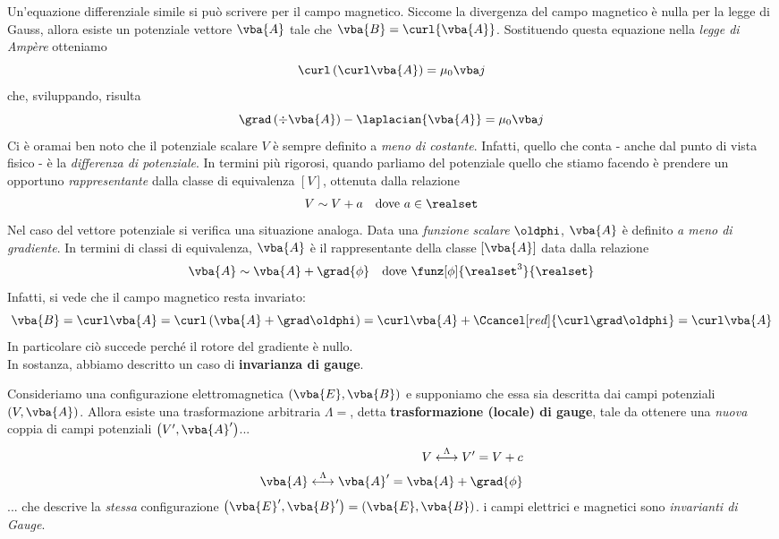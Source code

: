 Un'equazione differenziale simile si può scrivere per il campo magnetico.		Siccome la divergenza del campo magnetico è nulla per la legge di Gauss, allora esiste un potenziale vettore $\vba{A}$ tale che $\vba{B}=\curl{\vba{A}}$. Sostituendo questa equazione nella \textit{legge di Ampère} otteniamo
\begin{equation*}
	\curl\left(\curl\vba{A}\right)=\mu_0\vba j
\end{equation*}
che, sviluppando, risulta
\begin{equation*}
	\grad \left( \div{\vba{A}}\right) - \laplacian{\vba{A}}=\mu_0 \vba j
\end{equation*}
Ci è oramai ben noto che il potenziale scalare $V$ è sempre definito a \textit{meno di costante}. Infatti, quello che conta - anche dal punto di vista fisico - è la \textit{differenza di potenziale}. In termini più rigorosi, quando parliamo del potenziale quello che stiamo facendo è prendere un opportuno \textit{rappresentante} dalla classe di equivalenza $\left[V\right]$, ottenuta dalla relazione
\begin{align*}
	V\sim V+a && \text{dove}\ a\in\realset
\end{align*}
Nel caso del vettore potenziale si verifica una situazione analoga. Data una \textit{funzione scalare} $\oldphi$, $\vba{A}$ è definito \textit{a meno di gradiente}. In termini di classi di equivalenza, $\vba{A}$ è il rappresentante della classe $\left[\vba{A}\right]$ data dalla relazione
\begin{align*}
	\vba{A}\sim \vba{A}+\grad{\phi} && \text{dove}\ \funz[\phi]{\realset^3}{\realset}
\end{align*}
Infatti, si vede che il campo magnetico resta invariato:
\begin{equation*}
	\vba{B}=\curl\vba{A}=\curl \left( \vba{A}+\grad\oldphi\right)= \curl \vba{A} + \Ccancel[red]{\curl\grad\oldphi}=\curl\vba{A}		
\end{equation*}
In particolare ciò succede perché il rotore del gradiente è nullo.\\
In sostanza, abbiamo descritto un caso di \textbf{invarianza di gauge}.
\begin{define}
	Consideriamo una configurazione elettromagnetica $\left(\vba{E},\vba{B}\right)$ e supponiamo che essa sia descritta dai campi potenziali $\left(V,\vba {A}\right)$. Allora esiste una trasformazione arbitraria $\Lambda=$, detta \textbf{trasformazione (locale) di gauge}, tale da ottenere una \textit{nuova} coppia di campi potenziali $\left(V',\vba {A}'\right)$...
	\begin{align*}
		V\overset{\Lambda}{\longleftrightarrow} V'=V+c\\
		\vba{A}\overset{\Lambda}{\longleftrightarrow} \vba{A}'=\vba{A}+\grad{\phi}\\
	\end{align*}
	... che descrive la \textit{stessa} configurazione $\left(\vba{E}',\vba{B}'\right)=\left(\vba{E},\vba{B}\right)$. i campi elettrici e magnetici sono \textit{invarianti di Gauge}.
\end{define}
